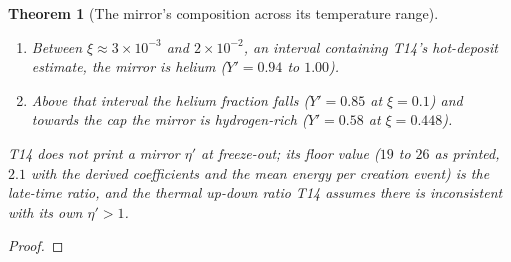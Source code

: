 \documentclass[11pt]{article}
\newtheorem{theorem}{Theorem}[section]
\theoremstyle{definition}
\theoremstyle{plain}
\begin{document}
\begin{theorem}[The mirror's composition across its temperature range]
\begin{enumerate}
\item[(ii)] Between $\xi \approx 3 \times 10^{-3}$ and $2 \times 10^{-2}$, an interval containing T14's hot-deposit estimate, the mirror is helium ($Y' = 0.94$ to $1.00$).
\item[(iii)] Above that interval the helium fraction falls ($Y' = 0.85$ at $\xi = 0.1$) and towards the cap the mirror is hydrogen-rich ($Y' = 0.58$ at $\xi = 0.448$).
\end{enumerate}
T14 does not print a mirror $\eta'$ at freeze-out; its floor value ($19$ to $26$ as printed, $2.1$ with the derived coefficients and the mean energy per creation event) is the late-time ratio, and the thermal up-down ratio T14 assumes there is inconsistent with its own $\eta' > 1$.
\end{theorem}
\begin{proof}

\end{proof}
\end{document}
